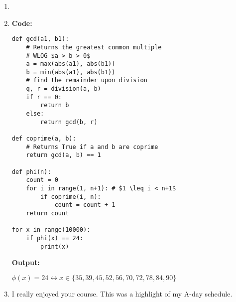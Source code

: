 \documentclass[12pt,letterpaper,english]{article}
\begin{document}
\begin{enumerate}
\item 

\item \textbf{Code:}

\begin{verbatim}
def gcd(a1, b1):
    # Returns the greatest common multiple
    # WLOG $a > b > 0$
    a = max(abs(a1), abs(b1))
    b = min(abs(a1), abs(b1))
	# find the remainder upon division
    q, r = division(a, b)
    if r == 0:
        return b
    else:
        return gcd(b, r)

def coprime(a, b):
    # Returns True if a and b are coprime
    return gcd(a, b) == 1

def phi(n):
    count = 0
    for i in range(1, n+1): # $1 \leq i < n+1$
        if coprime(i, n):
            count = count + 1
    return count

for x in range(10000):
    if phi(x) == 24:
        print(x)
\end{verbatim}

\textbf{Output:}

\(\phi(x) = 24 \leftrightarrow x \in \{35, 39, 45, 52, 56, 70, 72, 78, 84, 90\}\)

\item I really enjoyed your course. This was a highlight of my A-day schedule.

\end{enumerate}
\end{document}
